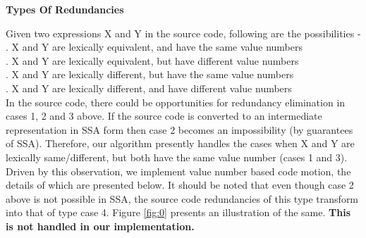\documentclass[10pt,twoside]{report}
\begin{document}
\begin{flushleft}
\textbf{\large{Types Of Redundancies}}
\end{flushleft}
Given two expressions X and Y in the source code, following are the possibilities - \\
. X and Y are lexically equivalent, and have the same value numbers \\
. X and Y are lexically equivalent, but have different value numbers \\
. X and Y are lexically different, but have the same value numbers \\
. X and Y are lexically different, and have different value numbers \\
In the source code, there could be opportunities for redundancy elimination in
cases 1, 2 and 3 above. If the source code is converted to an intermediate
representation in SSA form then case 2 becomes an impossibility (by guarantees of SSA). Therefore,
               our algorithm presently handles the cases when X and Y are
               lexically same/different, but both have the same value number (cases 1 and 3).
               Driven by this observation, we implement value number based code
               motion, the details of which are presented below. It should be
               noted that even though case 2 above is not possible in SSA,
               the source code redundancies  of this type transform into that
               of type case 4. Figure \ref{fig:0} presents an illustration of the same. \textbf{This is not handled
               in our implementation.} 
\end{document}
